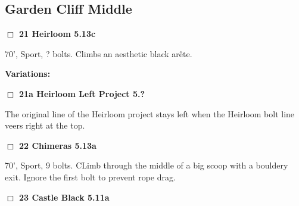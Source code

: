 	\begin{multicols}{2}



\needspace{10em}
\subsection*{Garden Cliff Middle}\label{bf:Garden Cliff Middle}




\needspace{2em}
\label{rt:Heirloom}
\colorbox{Goldenrod!20}{
\parbox{0.95\linewidth}{
\hspace{-1ex}\textbf{$\Box$
21 Heirloom 5.13c  
}}}
\begin{adjustwidth}{1.3em}{}			

70', Sport, ? bolts. Climbs an aesthetic black arête.
\end{adjustwidth}


\begin{adjustwidth}{0.5cm}{}				
\needspace{4em}
\textbf{Variations:} \newline

\needspace{2em}
\label{vr:Heirloom Left Project}
\colorbox{black!20}{
\parbox{0.95\linewidth}{
\hspace{-1ex}\textbf{$\Box$
21a Heirloom Left Project 5.?  
}}}
\begin{adjustwidth}{1.3em}{}			

The original line of the Heirloom project stays left when the Heirloom bolt line veers right at the top.
\end{adjustwidth}



\end{adjustwidth}


\needspace{2em}
\label{rt:Chimeras}
\colorbox{Goldenrod!20}{
\parbox{0.95\linewidth}{
\hspace{-1ex}\textbf{$\Box$
22 Chimeras 5.13a  
}}}
\begin{adjustwidth}{1.3em}{}			

70', Sport, 9 bolts. CLimb through the middle of a big scoop with a bouldery exit. Ignore the first bolt to prevent rope drag.
\end{adjustwidth}




\needspace{2em}
\label{rt:Castle Black}
\colorbox{RoyalBlue!20}{
\parbox{0.95\linewidth}{
\hspace{-1ex}\textbf{$\Box$
23 Castle Black 5.11a  
}}}
\begin{adjustwidth}{1.3em}{}			


\end{adjustwidth}
\end{multicols}
